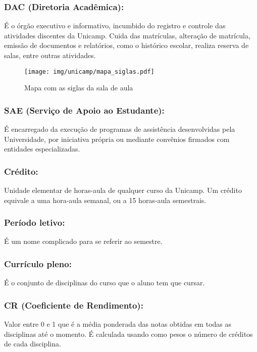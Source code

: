 \subsubsection{DAC (Diretoria Acadêmica):} É o órgão executivo e informativo,
incumbido do registro e controle das atividades discentes da Unicamp. Cuida das
matrículas, alteração de matrícula, emissão de documentos e relatórios, como o
histórico escolar, realiza reserva de salas, entre outras atividades.

\begin{figure*}[hb!]  \centering
  \texttt{[image: img/unicamp/mapa\_siglas.pdf]}
  \caption{Mapa com as siglas da sala de aula}
  \label{fig:mapa_siglas}
\end{figure*}

\subsubsection{SAE (Serviço de Apoio ao Estudante):} É encarregado da execução
de programas de assistência desenvolvidas pela Universidade, por iniciativa
própria ou mediante convênios firmados com entidades especializadas.

\subsubsection{Crédito:} Unidade elementar de horas-aula de qualquer curso da
Unicamp. Um crédito equivale a uma hora-aula semanal, ou a 15 horas-aula
semestrais.

\subsubsection{Período letivo:} É um nome complicado para se referir ao
semestre.

\subsubsection{Currículo pleno:} É o conjunto de disciplinas do curso que o
aluno tem que cursar.

\subsubsection{CR (Coeficiente de Rendimento):} Valor entre 0 e 1 que é a média
ponderada das notas obtidas em todas as disciplinas até o momento.  É calculada
usando como pesos o número de créditos de cada disciplina.

